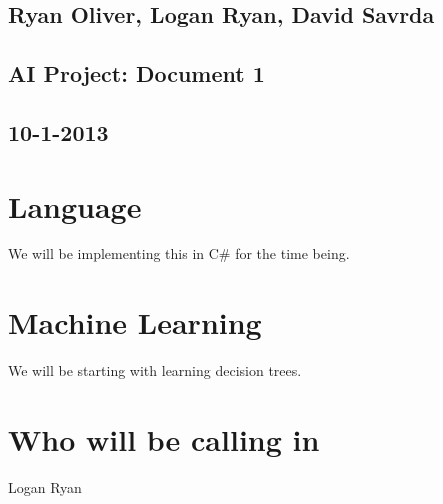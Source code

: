 \documentclass{article}
\begin{document}
	\begin{titlepage}
		\vspace*{\fill}
		\hrulefill
		\begin{center}
			\section*{Ryan Oliver, Logan Ryan, David Savrda}
			\subsection*{AI Project: Document 1}
			\subsection*{10-1-2013}
		\end{center}
		\hrulefill
		\vspace*{\fill}
	\end{titlepage}
	\newpage
	
	
	\section*{Language}
		We will be implementing this in C\# for the time being.
	\section*{Machine Learning}
		We will be starting with learning decision trees.
	\section*{Who will be calling in}
		Logan Ryan
\end{document}
